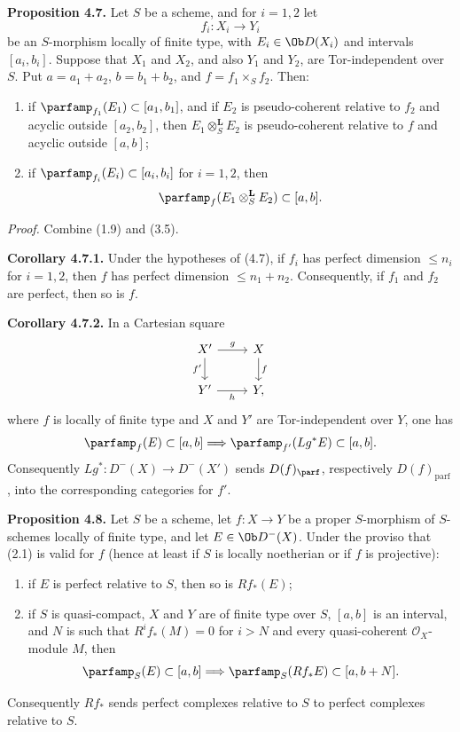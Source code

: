 \textbf{Proposition 4.7.} Let \(S\) be a scheme, and for \(i=1,2\) let
\[
 f_i:X_i\longrightarrow Y_i
\]
be an \(S\)-morphism locally of finite type, with \(E_i\in\Ob D(X_i)\) and intervals \([a_i,b_i]\). Suppose that \(X_1\) and \(X_2\), and also \(Y_1\) and \(Y_2\), are Tor-independent over \(S\). Put \(a=a_1+a_2\), \(b=b_1+b_2\), and \(f=f_1\times_S f_2\). Then:
\begin{enumerate}[label=\alph*)]
\item if \(\parfamp_{f_1}(E_1)\subset[a_1,b_1]\), and if \(E_2\) is pseudo-coherent relative to \(f_2\) and acyclic outside \([a_2,b_2]\), then \(E_1\otimes_S^{\mathbf L}E_2\) is pseudo-coherent relative to \(f\) and acyclic outside \([a,b]\);
\item if \(\parfamp_{f_i}(E_i)\subset[a_i,b_i]\) for \(i=1,2\), then
\[
 \parfamp_f(E_1\otimes_S^{\mathbf L}E_2)
 \subset[a,b].
\]
\end{enumerate}

\emph{Proof.} Combine (1.9) and (3.5).

\textbf{Corollary 4.7.1.} Under the hypotheses of (4.7), if \(f_i\) has perfect dimension \(\leq n_i\) for \(i=1,2\), then \(f\) has perfect dimension \(\leq n_1+n_2\). Consequently, if \(f_1\) and \(f_2\) are perfect, then so is \(f\).

\textbf{Corollary 4.7.2.} In a Cartesian square
\[
\begin{tikzcd}
X' \arrow[r,"g"] \arrow[d,"f'"'] & X \arrow[d,"f"]\\
Y' \arrow[r,"h"'] & Y,
\end{tikzcd}
\]
where \(f\) is locally of finite type and \(X\) and \(Y'\) are Tor-independent over \(Y\), one has
\[
 \parfamp_f(E)
 \subset[a,b]
 \Longrightarrow
 \parfamp_{f'}(Lg^*E)
 \subset[a,b].
\]
Consequently \(Lg^*:D^{-}(X)\to D^{-}(X')\) sends \(D(f)_{\parf}\), respectively \(D(f)_{\mathrm{parf}}\), into the corresponding categories for \(f'\).

\textbf{Proposition 4.8.} Let \(S\) be a scheme, let \(f:X\to Y\) be a proper \(S\)-morphism of \(S\)-schemes locally of finite type, and let \(E\in\Ob D^{-}(X)\). Under the proviso that (2.1) is valid for \(f\) (hence at least if \(S\) is locally noetherian or if \(f\) is projective):
\begin{enumerate}[label=\alph*)]
\item if \(E\) is perfect relative to \(S\), then so is \(Rf_*(E)\);
\item if \(S\) is quasi-compact, \(X\) and \(Y\) are of finite type over \(S\), \([a,b]\) is an interval, and \(N\) is such that \(R^if_*(M)=0\) for \(i>N\) and every quasi-coherent \(\mathcal O_X\)-module \(M\), then
\[
 \parfamp_S(E)\subset[a,b]
 \Longrightarrow
 \parfamp_S(Rf_*E)
 \subset[a,b+N].
\]
\end{enumerate}
Consequently \(Rf_*\) sends perfect complexes relative to \(S\) to perfect complexes relative to \(S\).

